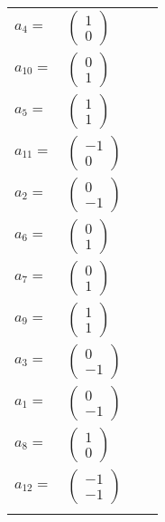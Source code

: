 \documentclass[1p]{elsarticle_modified}
\theoremstyle{definition}
\begin{document}
\begin{tabular}{m{7pt} m{180pt} m{7pt} m{180pt} }
\flushright $a_{4}=$&$\begin{pmatrix}1\\0\end{pmatrix}$ \\
\flushright $a_{10}=$&$\begin{pmatrix}0\\1\end{pmatrix}$ \\
\flushright $a_{5}=$&$\begin{pmatrix}1\\1\end{pmatrix}$ \\
\flushright $a_{11}=$&$\begin{pmatrix}-1\\0\end{pmatrix}$ \\
\flushright $a_{2}=$&$\begin{pmatrix}0\\-1\end{pmatrix}$ \\
\flushright $a_{6}=$&$\begin{pmatrix}0\\1\end{pmatrix}$ \\
\flushright $a_{7}=$&$\begin{pmatrix}0\\1\end{pmatrix}$ \\
\flushright $a_{9}=$&$\begin{pmatrix}1\\1\end{pmatrix}$ \\
\flushright $a_{3}=$&$\begin{pmatrix}0\\-1\end{pmatrix}$ \\
\flushright $a_{1}=$&$\begin{pmatrix}0\\-1\end{pmatrix}$ \\
\flushright $a_{8}=$&$\begin{pmatrix}1\\0\end{pmatrix}$ \\
\flushright $a_{12}=$&$\begin{pmatrix}-1\\-1\end{pmatrix}$\\&\end{tabular}
\end{document}
